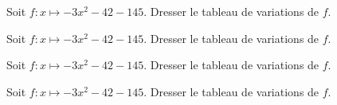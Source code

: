 \documentclass{exos}
\begin{document}
\begin{exercize*}
Soit $f \colon x \mapsto -3x^2 - 42 - 145$. Dresser le tableau de variations de $f$.
\end{exercize*}
\vspace*{5cm}
\begin{exercize*}
Soit $f \colon x \mapsto -3x^2 - 42 - 145$. Dresser le tableau de variations de $f$.
\end{exercize*}
\vspace*{5cm}
\begin{exercize*}
Soit $f \colon x \mapsto -3x^2 - 42 - 145$. Dresser le tableau de variations de $f$.
\end{exercize*}
\vspace*{5cm}
\begin{exercize*}
Soit $f \colon x \mapsto -3x^2 - 42 - 145$. Dresser le tableau de variations de $f$.
\end{exercize*}
\vspace*{5cm}
\end{document}
